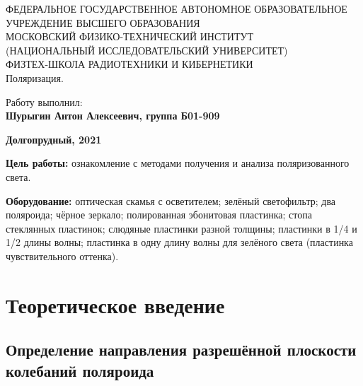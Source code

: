 \documentclass[15pt,a5paper,reqno]{article}
\begin{document}
\begin{center}
  {\small ФЕДЕРАЛЬНОЕ ГОСУДАРСТВЕННОЕ АВТОНОМНОЕ ОБРАЗОВАТЕЛЬНОЕ\\ УЧРЕЖДЕНИЕ ВЫСШЕГО ОБРАЗОВАНИЯ\\ МОСКОВСКИЙ ФИЗИКО-ТЕХНИЧЕСКИЙ ИНСТИТУТ\\ (НАЦИОНАЛЬНЫЙ ИССЛЕДОВАТЕЛЬСКИЙ УНИВЕРСИТЕТ)\\ ФИЗТЕХ-ШКОЛА РАДИОТЕХНИКИ И КИБЕРНЕТИКИ}\\
  \hfill \break
  \hfill \break
  \hfill \break
  \Huge{Поляризация.}\\
\end{center}

\hfill \break
\hfill \break
\hfill \break
\hfill \break
\hfill \break
\hfill \break

\begin{flushright}
  \normalsize{Работу выполнил:}\\
  \normalsize{\textbf{Шурыгин Антон Алексеевич, группа Б01-909}}\\
\end{flushright}

\begin{center}
  \normalsize{\textbf{Долгопрудный, 2021}}
\end{center}


\thispagestyle{empty} %


\newpage
\thispagestyle{plain}
\tableofcontents
\thispagestyle{plain}
\newpage



\textbf{Цель работы:} ознакомление с методами получения и анализа поляризованного света.

\textbf{Оборудование:} оптическая скамья с осветителем; зелёный светофильтр; два поляроида; чёрное зеркало; полированная эбонитовая пластинка; стопа стеклянных пластинок; слюдяные пластинки разной толщины; пластинки в 1/4 и 1/2 длины волны; пластинка в одну длину волны для зелёного света (пластинка чувствительного оттенка).

\section{Теоретическое введение}

\subsection{Определение направления разрешённой плоскости колебаний поляроида}
\end{document}
